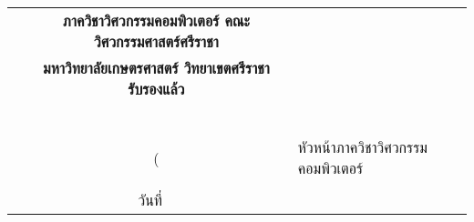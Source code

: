 \begin{tabularx}{\textwidth}{Xc}
& \textbf{ภาควิชาวิศวกรรมคอมพิวเตอร์ คณะวิศวกรรมศาสตร์ศรีราชา}\\
& \textbf{มหาวิทยาลัยเกษตรศาสตร์ วิทยาเขตศรีราชา รับรองแล้ว}\\
& \\
& \dotfill\ \\
& (%
& หัวหน้าภาควิชาวิศวกรรมคอมพิวเตอร์ \\
& \\
& วันที่ \dotfill\ \\
\end{tabularx}
